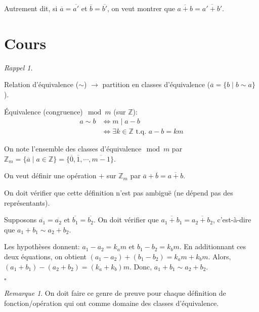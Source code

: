 \documentclass{report}
\newcounter{cours}
\newcommand*{\cours}{\section*{Cours \thecours}\stepcounter{cours}}
\newcommand*{\entiers}{\mathbb{Z}}
\theoremstyle{definition}
\theoremstyle{remark}
\newtheorem*{rema}{Remarque}
\newtheorem*{rappel}{Rappel}
\begin{document}
	Autrement dit, si $\overline{a} = \overline{a'}$ et $\overline{b} = \overline{b'}$, on veut montrer que $\overline{a+b} = \overline{a'+b'}$.

	\cours
	\begin{rappel}
		~

		\begin{ulist}[noitemsep]
			\item Relation d'\'equivalence ($\sim$) $\rightarrow$ partition en classes d'\'equivalence ($\overline{a}=\{b \mid b \sim a\}$).
			\item \'Equivalence (congruence)$\mod m$ (sur $\entiers$):
			\begin{align*}
				a \sim b&\Leftrightarrow m \mid a-b\\
				&\Leftrightarrow \exists k \in \entiers \text{ t.q. } a-b=km
			\end{align*}

			On note l'ensemble des classes d'\'equivalence$\mod m$ par $\entiers_m = \{\overline{a} \mid a \in \entiers\} = \{\overline{0}, \overline{1}, \dotsb, \overline{m-1}\}$.

			On veut d\'efinir une op\'eration $+$ sur $\entiers_m$ par $\overline{a} + \overline{b} = \overline{a+b}$.

			On doit v\'erifier que cette d\'efinition n'est pas ambigu\"e (ne d\'epend pas des repr\'esentants).

			Supposons $\overline{a_1} = \overline{a_2}$ et $\overline{b_1} = \overline{b_2}$. On doit v\'erifier que $\overline{a_1+b_1} = \overline{a_2+b_2}$, c'est-\`a-dire que $a_1+b_1 \sim a_2+b_2$.

			Les hypoth\`eses donnent: $a_1-a_2=k_am$ et $b_1-b_2=k_bm$. En additionnant ces deux \'equations, on obtient $(a_1-a_2)+(b_1-b_2) = k_am+k_bm$. Alors, $(a_1+b_1) - (a_2+b_2) = (k_a+k_b)m$. Donc, $a_1+b_1 \sim a_2+b_2$.
			\begin{flushright}
				$\square$
			\end{flushright}
			\begin{rema}
				On doit faire ce genre de preuve pour chaque d\'efinition de fonction/op\'eration qui ont comme domaine des classes d'\'equivalence.
			\end{rema}
		\end{ulist}
	\end{rappel}
\end{document}
